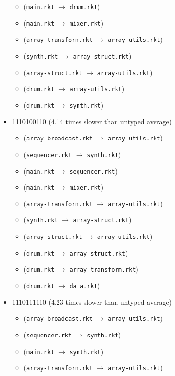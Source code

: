 \documentclass{article}
\newcommand{\mono}[1]{\texttt{#1}}
\begin{document}
\begin{itemize}
\begin{itemize}
  \item (\mono{main.rkt} $\rightarrow$ \mono{drum.rkt})
  \item (\mono{main.rkt} $\rightarrow$ \mono{mixer.rkt})
  \item (\mono{array-transform.rkt} $\rightarrow$ \mono{array-utils.rkt})
  \item (\mono{synth.rkt} $\rightarrow$ \mono{array-struct.rkt})
  \item (\mono{array-struct.rkt} $\rightarrow$ \mono{array-utils.rkt})
  \item (\mono{drum.rkt} $\rightarrow$ \mono{array-utils.rkt})
  \item (\mono{drum.rkt} $\rightarrow$ \mono{synth.rkt})
  \end{itemize}
\item 1110100110 (4.14 times slower than untyped average)
  \begin{itemize}
  \item (\mono{array-broadcast.rkt} $\rightarrow$ \mono{array-utils.rkt})
  \item (\mono{sequencer.rkt} $\rightarrow$ \mono{synth.rkt})
  \item (\mono{main.rkt} $\rightarrow$ \mono{sequencer.rkt})
  \item (\mono{main.rkt} $\rightarrow$ \mono{mixer.rkt})
  \item (\mono{array-transform.rkt} $\rightarrow$ \mono{array-utils.rkt})
  \item (\mono{synth.rkt} $\rightarrow$ \mono{array-struct.rkt})
  \item (\mono{array-struct.rkt} $\rightarrow$ \mono{array-utils.rkt})
  \item (\mono{drum.rkt} $\rightarrow$ \mono{array-struct.rkt})
  \item (\mono{drum.rkt} $\rightarrow$ \mono{array-transform.rkt})
  \item (\mono{drum.rkt} $\rightarrow$ \mono{data.rkt})
  \end{itemize}
\item 1110111110 (4.23 times slower than untyped average)
  \begin{itemize}
  \item (\mono{array-broadcast.rkt} $\rightarrow$ \mono{array-utils.rkt})
  \item (\mono{sequencer.rkt} $\rightarrow$ \mono{synth.rkt})
  \item (\mono{main.rkt} $\rightarrow$ \mono{synth.rkt})
  \item (\mono{array-transform.rkt} $\rightarrow$ \mono{array-utils.rkt})

\end{itemize}
\end{itemize}
\end{document}
